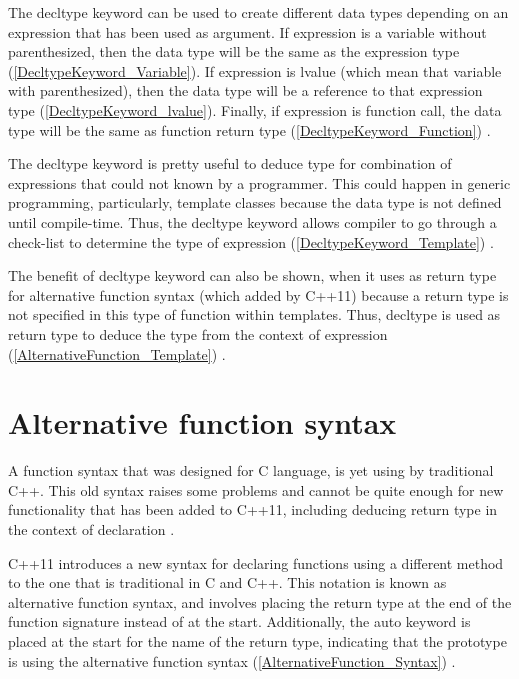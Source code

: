 \documentclass[11pt]{report}
\begin{document}
The decltype keyword can be used to create different data types depending on an expression that has been used as argument.  If expression is a variable without parenthesized, then the data type will be the same as the expression type (\ref{DecltypeKeyword_Variable}). If expression is lvalue (which mean that variable with parenthesized), then the data type will be a reference to that expression type (\ref{DecltypeKeyword_lvalue}). Finally, if expression is function call, the data type will be the same as function return type (\ref{DecltypeKeyword_Function}) \cite{Prata:2012:Cpp}.


The decltype keyword is pretty useful to deduce type for combination of expressions that could not known by a programmer. This could happen in generic programming, particularly, template classes because the data type is not defined until compile-time. Thus, the decltype keyword allows compiler to go through a check-list to determine the type of expression (\ref{DecltypeKeyword_Template}) \cite{Stroustrup:2012:Cpp11}.


The benefit of decltype keyword can also be shown, when it uses as return type for alternative function syntax (which added by C++11) because a return type is not specified in this type of function within templates. Thus, decltype is used as return type to deduce the type from the context of expression (\ref{AlternativeFunction_Template}) \cite{Gregorie:professionalcpp}. 

\section{Alternative function syntax}
\label{section: Alternative function syntax}
A function syntax that was designed for C language, is yet using by traditional C++. This old syntax raises some problems and cannot be quite enough for new functionality that has been added to C++11, including deducing return type in the context of declaration \cite{Gregorie:professionalcpp}.


C++11 introduces a new syntax for declaring functions using a different method to the one that is traditional in C and C++. This notation is known as alternative function syntax, and involves placing the return type at the end of the function signature instead of at the start. Additionally, the auto keyword is placed at the start for the name of the return type, indicating that the prototype is using the alternative function syntax (\ref{AlternativeFunction_Syntax}) \cite{Gregorie:professionalcpp}.
\end{document}

